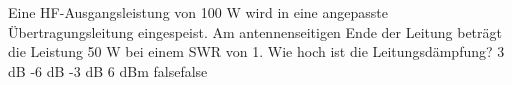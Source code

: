     {Eine HF-Ausgangsleistung von 100 W wird in eine angepasste Übertragungsleitung eingespeist. Am antennenseitigen Ende der Leitung beträgt die Leistung 50 W bei einem SWR von 1. Wie hoch ist die Leitungsdämpfung?}
    {3 dB}
    {-6 dB}
    {-3 dB}
    {6 dBm}
    {false}{false}